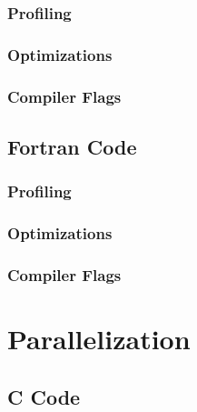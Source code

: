 \documentclass{scrartcl}
\begin{document}
    \subsubsection{Profiling}
    \subsubsection{Optimizations}
    \subsubsection{Compiler Flags}

    \subsection{Fortran Code}
    
    \subsubsection{Profiling}
    \subsubsection{Optimizations}
    \subsubsection{Compiler Flags}

    \section{Parallelization}
    \subsection{C Code}  
\end{document}
